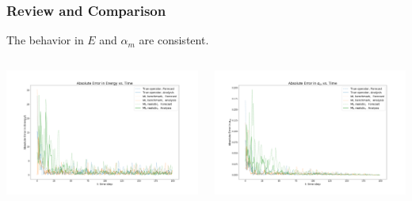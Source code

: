 \documentclass{beamer}
\begin{document}
\begin{frame}
\frametitle{Review and Comparison}
The behavior in $E$ and $\alpha_m$ are consistent.
\begin{columns}
\begin{column}{0.5\linewidth}
\centering
\includegraphics[width=\linewidth]{Figures/AbsoluteError_E_2.png}
\end{column}
\begin{column}{0.5\linewidth}
\centering
\includegraphics[width=\linewidth]{Figures/AbsoluteError_am_2.png}
\end{column}
\end{columns}
\end{frame}
\end{document}
